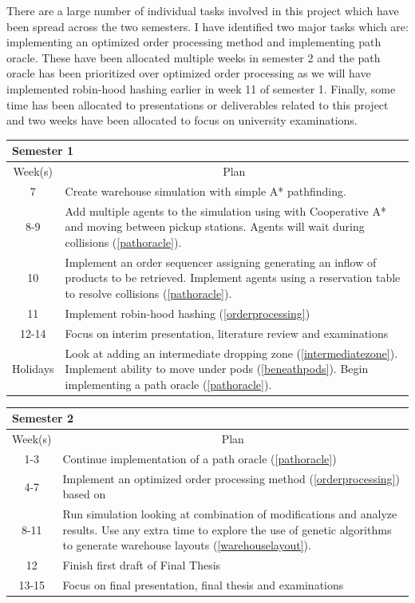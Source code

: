 \documentclass[a4paper,11pt]{article}
\begin{document}
There are a large number of individual tasks involved in this project which have been spread across the two semesters. I have identified two major tasks which are: implementing an optimized order processing method and implementing path oracle. These have been allocated multiple weeks in semester 2 and the path oracle has been prioritized over optimized order processing as we will have implemented robin-hood hashing earlier in week 11 of semester 1. Finally, some time has been allocated to presentations or deliverables related to this project and two weeks have been allocated to focus on university examinations.

\begin{center}
{\footnotesize
\begin{tabular}{ c p{12cm} }
\multicolumn{2}{l}{\textbf{Semester 1}} \\
\hline \multicolumn{1}{c}{Week(s)} & \multicolumn{1}{c}{Plan} \\
\hline 7  & Create warehouse simulation with simple A* pathfinding. \\
\hline 8-9  & Add multiple agents to the simulation using with Cooperative A* and moving between pickup stations. Agents will wait during collisions (\ref{pathoracle}). \\
\hline 10 & Implement an order sequencer assigning generating an inflow of products to be retrieved. Implement agents using a reservation table to resolve collisions (\ref{pathoracle}). \\
\hline 11 & Implement robin-hood hashing (\ref{orderprocessing}) \\
\hline 12-14 & Focus on interim presentation, literature review and examinations \\
\hline Holidays & Look at adding an intermediate dropping zone (\ref{intermediatezone}). Implement ability to move under pods (\ref{beneathpods}). Begin implementing a path oracle (\ref{pathoracle}). \\
\hline
\end{tabular}
}

{\footnotesize
\vspace{0.5cm}
\begin{tabular}{ c p{12cm} }
\multicolumn{2}{l}{\textbf{Semester 2}} \\
\hline \multicolumn{1}{c}{Week(s)} & \multicolumn{1}{c}{Plan} \\
\hline 1-3 & Continue implementation of a path oracle (\ref{pathoracle}) \\
\hline 4-7 & Implement an optimized order processing method (\ref{orderprocessing}) based on \cite{boysen2017parts} \\
\hline 8-11 & Run simulation looking at combination of modifications and analyze results. Use any extra time to explore the use of genetic algorithms to generate warehouse layouts (\ref{warehouselayout}). \\
\hline 12 & Finish first draft of Final Thesis \\
\hline 13-15 & Focus on final presentation, final thesis and examinations \\
\hline
\end{tabular}
}
\end{center}
\end{document}
